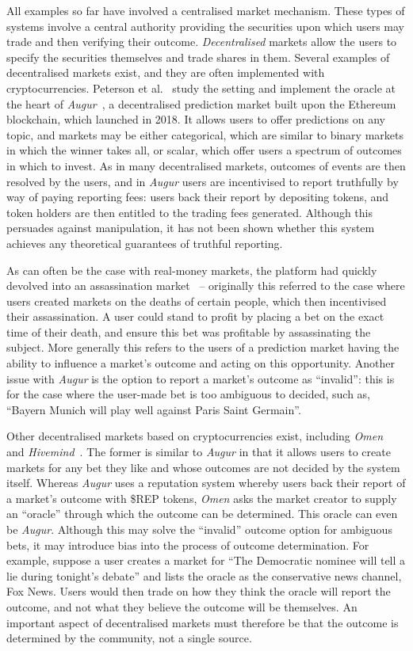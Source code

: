 All examples so far have involved a centralised market mechanism. These types
of systems involve a central authority providing the securities upon which
users may trade and then verifying their outcome. \emph{Decentralised} markets
allow the users to specify the securities themselves and trade shares in them.
Several examples of decentralised markets exist, and they are often implemented
with cryptocurrencies. Peterson et al.~\cite{Peterson2015} study the setting
and implement the oracle at the heart of \emph{Augur}~\cite{Augur}, a
decentralised prediction market built upon the Ethereum blockchain, which
launched in 2018. It allows users to offer predictions on any topic, and
markets may be either categorical, which are similar to binary markets in which
the winner takes all, or scalar, which offer users a spectrum of outcomes in
which to invest. As in many decentralised markets, outcomes of events are then
resolved by the users, and in \emph{Augur} users are incentivised to report
truthfully by way of paying reporting fees: users back their report by
depositing tokens, and token holders are then entitled to the trading fees
generated.  Although this persuades against manipulation, it has not been shown
whether this system achieves any theoretical guarantees of truthful reporting.

As can often be the case with real-money markets, the platform had quickly
devolved into an assassination market~\cite{AugurDeathMarket} -- originally
this referred to the case where users created markets on the deaths of certain
people, which then incentivised their assassination. A user could stand to
profit by placing a bet on the exact time of their death, and ensure this bet
was profitable by assassinating the subject. More generally this refers to the
users of a prediction market having the ability to influence a market's outcome
and acting on this opportunity. Another issue with \emph{Augur} is the option
to report a market's outcome as ``invalid'': this is for the case where the
user-made bet is too ambiguous to decided, such as, ``Bayern Munich will play
well against Paris Saint Germain''.

Other decentralised markets based on cryptocurrencies exist, including
\emph{Omen}~\cite{Omen} and \emph{Hivemind}~\cite{Hivemind}. The former is
similar to \emph{Augur} in that it allows users to create markets for any bet
they like and whose outcomes are not decided by the system itself. Whereas
\emph{Augur} uses a reputation system whereby users back their report of a
market's outcome with \$REP tokens, \emph{Omen} asks the market creator to
supply an ``oracle'' through which the outcome can be determined. This oracle
can even be \emph{Augur}. Although this may solve the ``invalid'' outcome
option for ambiguous bets, it may introduce bias into the process of outcome
determination. For example, suppose a user creates a market for ``The
Democratic nominee will tell a lie during tonight's debate'' and lists the
oracle as the conservative news channel, Fox News. Users would then trade on
how they think the oracle will report the outcome, and not what they believe
the outcome will be themselves. An important aspect of decentralised markets
must therefore be that the outcome is determined by the community, not a single
source. 

